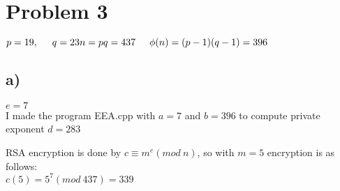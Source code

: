 \documentclass{article}
\begin{document}
\section*{Problem 3}

$p = 19, \hspace{5 mm} q = 23\\
n = pq = 437 \hspace{5 mm} \phi(n) = (p-1)(q-1) = 396$

\subsection*{a)}
$e = 7$\\
I made the program EEA.cpp with $a=7$ and $b=396$ to compute private exponent $d=283$

RSA encryption is done by $c \equiv m^{e}(mod \: n)$, so with $m=5$ encryption is as follows:\\
$c(5) = 5^{7}(mod \: 437) = 339$
\end{document}
